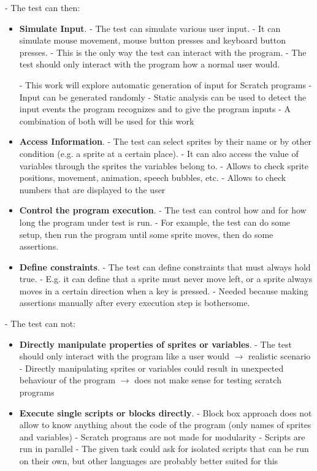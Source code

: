 \noindent- The test can then:
\begin{itemize}
    \item \textbf{Simulate Input}.
        - The test can simulate various user input.
        - It can simulate mouse movement, mouse button presses and keyboard button presses.
        - This is the only way the test can interact with the program.
        - The test should only interact with the program how a normal user would.

        - This work will explore automatic generation of input for Scratch programs
        - Input can be generated randomly
        - Static analysis can be used to detect the input events the program recognizes and to give the program inputs
        - A combination of both will be used for this work
    \item \textbf{Access Information}.
        - The test can select sprites by their name or by other condition (e.g. a sprite at a certain place).
        - It can also access the value of variables through the sprites the variables belong to.
        - Allows to check sprite positions, movement, animation, speech bubbles, etc.
        - Allows to check numbers that are displayed to the user
    \item \textbf{Control the program execution}.
        - The test can control how and for how long the program under test is run.
        - For example, the test can do some setup, then run the program until some sprite moves, then do some assertions.
    \item \textbf{Define constraints}.
        - The test can define constraints that must always hold true.
        - E.g. it can define that a sprite must never move left, or a sprite always moves in a certain direction when a key is pressed.
        - Needed because making assertions manually after every execution step is bothersome.
\end{itemize}

\noindent- The test can not:
\begin{itemize}
    \item \textbf{Directly manipulate properties of sprites or variables}.
        - The test should only interact with the program like a user would $\rightarrow$ realistic scenario
        - Directly manipulating sprites or variables could result in unexpected behaviour of the program
        $\rightarrow$ does not make sense for testing scratch programs
    \item \textbf{Execute single scripts or blocks directly}.
        - Block box approach does not allow to know anything about the code of the program (only names of sprites and variables)
        - Scratch programs are not made for modularity
            - Scripts are run in parallel
            - The given task could ask for isolated scripts that can be run on their own, but other languages are probably better suited for this

\end{itemize}

